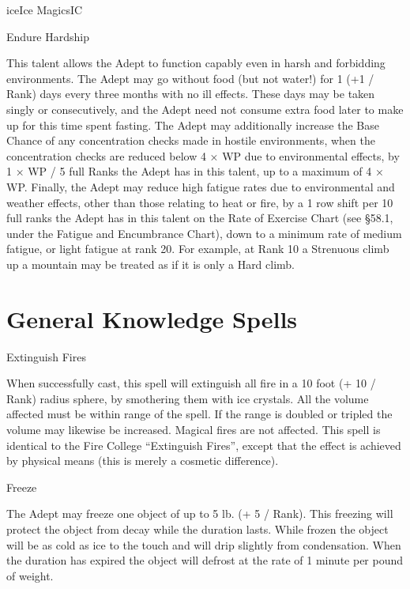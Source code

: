 \begin{College}[1.5]{ice}{Ice Magics}{IC}
\begin{talent}[T-2]{Endure Hardship}
\begin{effects}
This talent allows the Adept to function capably even in harsh and
forbidding environments.  The Adept may go without food (but not
water!) for 1 (+1 / Rank) days every three months with no ill
effects. These days may be taken singly or consecutively, and the
Adept need not consume extra food later to make up for this time spent
fasting.  The Adept may additionally increase the Base Chance of any
concentration checks made in hostile environments, when the
concentration checks are reduced below 4 × WP due to environmental
effects, by 1 × WP / 5 full Ranks the Adept has in this talent, up to
a maximum of 4 × WP.  Finally, the Adept may reduce high fatigue rates
due to environmental and weather effects, other than those relating to
heat or fire, by a 1 row shift per 10 full ranks the Adept has in this
talent on the Rate of Exercise Chart (see §58.1, under the Fatigue
and Encumbrance Chart), down to a minimum rate of medium fatigue, or
light fatigue at rank 20.  For example, at Rank 10 a Strenuous climb
up a mountain may be treated as if it is only a Hard climb.
\end{effects}
\end{talent}

\section{General Knowledge Spells}

\begin{spell}[G-1]{Extinguish Fires}

\begin{effects}
When successfully cast, this spell will extinguish all fire in a 10
foot (+ 10 / Rank) radius sphere, by smothering them with ice
crystals.  All the volume affected must be within range of the
spell. If the range is doubled or tripled the volume may likewise be
increased.  Magical fires are not affected.  This spell is identical
to the Fire College “Extinguish Fires”, except that the effect is
achieved by physical means (this is merely a cosmetic difference).
\end{effects}
\end{spell}

\begin{spell}[G-2]{Freeze}
\begin{effects}
The Adept may freeze one object of up to 5 lb.  (+ 5 / Rank).  This
freezing will protect the object from decay while the duration lasts.
While frozen the object will be as cold as ice to the touch and will
drip slightly from condensation. When the duration has expired the
object will defrost at the rate of 1 minute per pound of weight.
\end{effects}
\end{spell}


\end{College}
